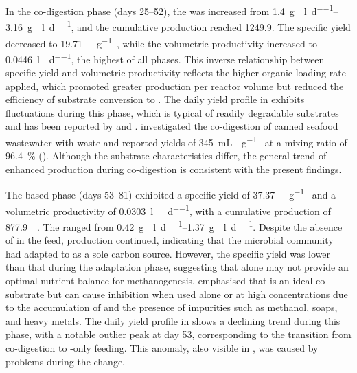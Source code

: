 In the co-digestion phase (days \numrange[parse-numbers=false]{25}{52}), the  was increased from \qtyrange{1.4}{3.16}{\gram\VS\per\litre\per\day}, and the cumulative  production reached \qty{1249.9}{\nml}. The specific yield decreased to \qty{19.71}{\nml\CH\per\gram\VSfed}, while the volumetric productivity increased to \qty{0.0446}{\litre\per\reactorlitre\per\day}, the highest of all phases. This inverse relationship between specific yield and volumetric productivity reflects the higher organic loading rate applied, which promoted greater  production per reactor volume but reduced the efficiency of substrate conversion to . The daily yield profile in  exhibits fluctuations during this phase, which is typical of readily degradable substrates and has been reported by \textcite{tomczak2025} and \textcite{srimachai2025}. \textcite{srimachai2025} investigated the co-digestion of canned seafood wastewater with  waste and reported  yields of \qty{345}{\mL\CH\per\gram\COD} at a mixing ratio of \qty{96.4}{\percent} (). Although the substrate characteristics differ, the general trend of enhanced  production during co-digestion is consistent with the present findings.

The  based phase (days \numrange[parse-numbers=false]{53}{81}) exhibited a specific yield of \qty{37.37}{\nml\CH\per\gram\VSfed} and a volumetric productivity of \qty{0.0303}{\litre\CH\per\reactorlitre\per\day}, with a cumulative  production of \qty{877.9}{\nml\CH}. The  ranged from \qtyrange{0.42}{1.37}{\gram\VS\per\litre\per\day}. Despite the absence of  in the feed,  production continued, indicating that the microbial community had adapted to  as a sole carbon source. However, the specific yield was lower than that during the adaptation phase, suggesting that  alone may not provide an optimal nutrient balance for methanogenesis. \textcite{tomczak2025} emphasised that  is an ideal co-substrate but can cause inhibition when used alone or at high concentrations due to the accumulation of  and the presence of impurities such as methanol, soaps, and heavy metals. The daily yield profile in  shows a declining trend during this phase, with a notable outlier peak at day \num[parse-numbers=false]{53}, corresponding to the transition from co-digestion to -only feeding. This anomaly, also visible in , was caused by problems during the change.

